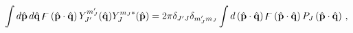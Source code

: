 \begin{equation}
\int d\hat{\mathbf{p}}\,d\hat{\mathbf{q}}\,\digamma \left( \hat{%
\mathbf{p}}\cdot \hat{\mathbf{q}}\right) Y_{J^{\prime }}^{m_{J}^{\prime
}}(\hat{\mathbf{q}})Y_{J}^{m_{J}\ast }(\hat{\mathbf{p}})=2\pi \delta
_{J^{\prime }J}\delta _{m_{J}^{\prime }m_{J}}\int d\left( \hat{\mathbf{p}%
}\cdot \hat{\mathbf{q}}\right) \digamma \left( \hat{\mathbf{p}}\cdot 
\hat{\mathbf{q}}\right) P_{J}\left( \hat{\mathbf{p}}\cdot \hat{%
\mathbf{q}}\right)\, ,
\end{equation}

